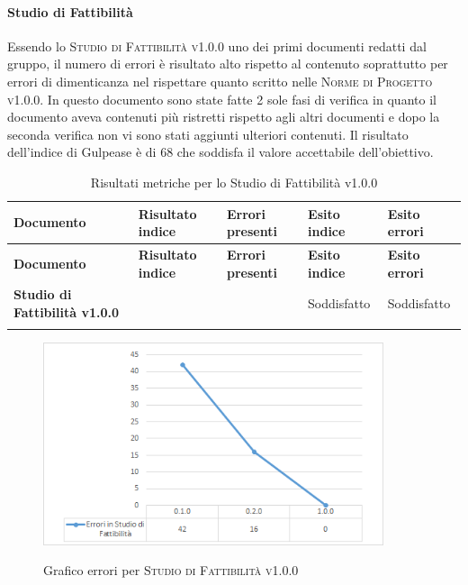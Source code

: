 \documentclass[../piano-di-qualifica.tex]{subfiles}
\begin{document}
\paragraph{Studio di Fattibilità}
\label{sub:studio_di_fattibilita}
Essendo lo \textsc{Studio di Fattibilità v1.0.0} uno dei primi documenti redatti dal gruppo, il numero di errori è risultato alto rispetto al contenuto soprattutto per errori di dimenticanza nel rispettare quanto scritto nelle \textsc{Norme di Progetto v1.0.0}.
In questo documento sono state fatte 2 sole fasi di verifica in quanto il documento aveva contenuti più ristretti rispetto agli altri documenti e dopo la seconda verifica non vi sono stati aggiunti ulteriori contenuti.
Il risultato dell'indice di Gulpease è di 68 che soddisfa il valore accettabile dell'obiettivo.

\renewcommand{\arraystretch}{2} %
\begin{longtable}[H]{>{\centering\bfseries}m{6cm} >{\centering}m{2cm} >{\centering}m{2.5cm} >{\centering}m{2.5cm} >{\centering\arraybackslash}m{2.5cm}}  
  \rowcolor{lightgray}
  {\textbf{Documento}} & {\textbf{Risultato indice}} & {\textbf{Errori presenti}} & {\textbf{Esito indice}} & {\textbf{Esito errori}}  \\
  \endfirsthead%
  \rowcolor{lightgray}
  {\textbf{Documento}} & {\textbf{Risultato indice}} & {\textbf{Errori presenti}} & {\textbf{Esito indice}} & {\textbf{Esito errori}}  \\
  \endhead%
  \textbf{Studio di Fattibilità v1.0.0} & 68                 & 0               & Soddisfatto & Soddisfatto \\
  \caption{Risultati metriche per lo Studio di Fattibilità v1.0.0}
  \label{tab:my-table}
\end{longtable}

    \begin{figure}[H]
        \centering
        \includegraphics[width=10cm]{img/erroriStudio.png}
        \label{fig:scice_documenti}
        \caption{Grafico errori per \textsc{Studio di Fattibilità v1.0.0}}
    \end{figure}
\end{document}
